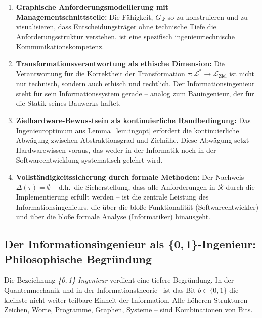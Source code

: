 ﻿\documentclass[a4paper,12pt]{article}
\theoremstyle{definition}
\begin{document}
\begin{enumerate}
  \item \textbf{Graphische Anforderungsmodellierung mit Managementschnittstelle:}
        Die Fähigkeit, $G_\mathcal{R}$ so zu konstruieren und zu visualisieren, dass
        Entscheidungsträger ohne technische Tiefe die Anforderungsstruktur verstehen,
        ist eine spezifisch ingenieurtechnische Kommunikationskompetenz.

  \item \textbf{Transformationsverantwortung als ethische Dimension:}
        Die Verantwortung für die Korrektheit der Transformation
        $\tau: \mathcal{L}^* \to \mathcal{L}_{\text{Ziel}}$ ist nicht nur technisch,
        sondern auch ethisch und rechtlich. Der Informationsingenieur steht für sein
        Informationssystem gerade -- analog zum Bauingenieur, der für die Statik seines
        Bauwerks haftet.

  \item \textbf{Zielhardware-Bewusstsein als kontinuierliche Randbedingung:}
        Das Ingenieuroptimum aus Lemma~\ref{lem:ingopt} erfordert die kontinuierliche
        Abwägung zwischen Abstraktionsgrad und Zielnähe. Diese Abwägung setzt
        Hardwarewissen voraus, das weder in der Informatik noch in der
        Softwareentwicklung systematisch gelehrt wird.

  \item \textbf{Vollständigkeitssicherung durch formale Methoden:}
        Der Nachweis $\Delta(\tau) = \emptyset$ -- d.h.\ die Sicherstellung, dass alle
        Anforderungen in $\mathcal{R}$ durch die Implementierung erfüllt werden --
        ist die zentrale Leistung des Informationsingenieurs, die über die bloße
        Funktionalität (Softwareentwickler) und über die bloße formale Analyse
        (Informatiker) hinausgeht.
\end{enumerate}

\subsection{Der Informationsingenieur als \{0,\,1\}-Ingenieur: Philosophische Begründung}

Die Bezeichnung \emph{\{0,\,1\}-Ingenieur} verdient eine tiefere Begründung.
In der Quantenmechanik und in der Informationstheorie~\cite{shannon1948} ist das Bit
$b \in \{0,1\}$ die kleinste nicht-weiter-teilbare Einheit der Information. Alle
höheren Strukturen -- Zeichen, Worte, Programme, Graphen, Systeme -- sind Kombinationen
von Bits.
\end{document}
